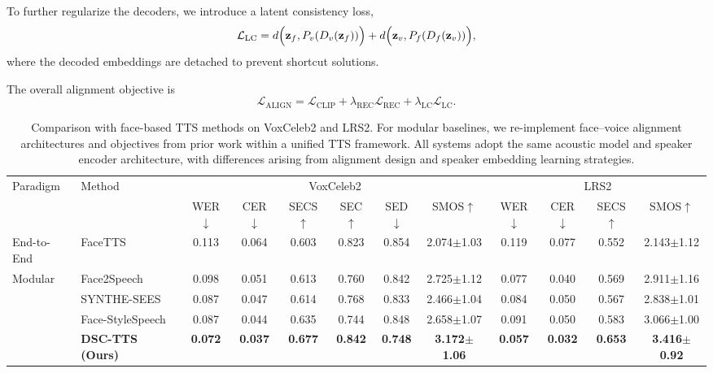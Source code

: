 \documentclass[cameraready]{Interspeech}
\begin{document}
To further regularize the decoders, we introduce a latent consistency loss,
\begin{equation}
\mathcal{L}_{\mathrm{LC}}
=
d\Bigl(\mathbf{z}_f, P_v(D_v(\mathbf{z}_f))\Bigr)
+
d\Bigl(\mathbf{z}_v, P_f(D_f(\mathbf{z}_v))\Bigr),
\end{equation}
where the decoded embeddings are detached to prevent shortcut solutions.

The overall alignment objective is
\begin{equation}
\mathcal{L}_{\mathrm{ALIGN}}
=
\mathcal{L}_{\mathrm{CLIP}}
+
\lambda_{\mathrm{REC}} \mathcal{L}_{\mathrm{REC}}
+
\lambda_{\mathrm{LC}} \mathcal{L}_{\mathrm{LC}}.
\end{equation}

\begin{table}[t]
\caption{
Comparison with face-based TTS methods on VoxCeleb2 and LRS2. For modular baselines, we re-implement face--voice alignment architectures and objectives from prior work within a unified TTS framework. All systems adopt the same acoustic model and speaker encoder architecture, with differences arising from alignment design and speaker embedding learning strategies.
}
\label{tab:comparison}
\centering
\small
\setlength{\tabcolsep}{3.2pt}
\begin{tabular*}{\textwidth}{@{\extracolsep{\fill}}ll|cccccc|cccc}
\toprule
Paradigm & Method
& \multicolumn{6}{c|}{VoxCeleb2}
& \multicolumn{4}{c}{LRS2} \\
 &
& WER$\downarrow$ & CER$\downarrow$ & SECS$\uparrow$ & SEC$\uparrow$ & SED$\downarrow$ & SMOS$\uparrow$
& WER$\downarrow$ & CER$\downarrow$ & SECS$\uparrow$ & SMOS$\uparrow$ \\
\midrule
End-to-End
& FaceTTS
& 0.113 & 0.064 & 0.603 & 0.823 & 0.854 & 2.074$\pm$1.03
& 0.119 & 0.077 & 0.552 & 2.143$\pm$1.12 \\
\midrule
\multirow{4}{*}{Modular}
& Face2Speech
& 0.098 & 0.051 & 0.613 & 0.760 & 0.842 & 2.725$\pm$1.12
& 0.077 & 0.040 & 0.569 & 2.911$\pm$1.16 \\
& SYNTHE-SEES
& 0.087 & 0.047 & 0.614 & 0.768 & 0.833 & 2.466$\pm$1.04
& 0.084 & 0.050 & 0.567 & 2.838$\pm$1.01 \\
& Face-StyleSpeech
& 0.087 & 0.044 & 0.635 & 0.744 & 0.848 & 2.658$\pm$1.07
& 0.091 & 0.050 & 0.583 & 3.066$\pm$1.00 \\
& \textbf{DSC-TTS (Ours)}
& \textbf{0.072} & \textbf{0.037} & \textbf{0.677} & \textbf{0.842} & \textbf{0.748} & \textbf{3.172$\pm$1.06}
& \textbf{0.057} & \textbf{0.032} & \textbf{0.653} & \textbf{3.416$\pm$0.92} \\
\bottomrule
\end{tabular*}
\end{table}
\end{document}
